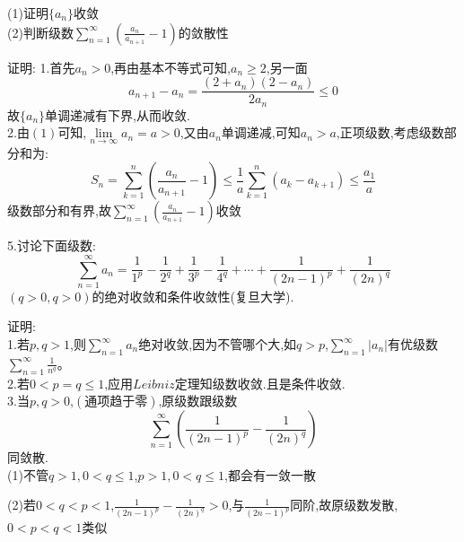 \documentclass{ctexart}
\begin{document}
\begin{tcolorbox}[title = {综合性问题},colbacktitle=red!25!white,colback=white,arc = 2mm, outer arc = 2mm,fonttitle = \itshape, fontupper = \itshape, fontlower = \itshape]
	(1)证明$\{a_{n}\}$收敛 \\
	(2)判断级数$\displaystyle{\sum\limits_{n=1}^{\infty}\left(\frac{a_{n}}{a_{n+1}} -1\right) }$的敛散性\\
	\begin{tcolorbox}[colback=white,arc = 1mm, outer arc = 1mm,fonttitle = \itshape, fontupper = \itshape, fontlower = \itshape]
		{\color{red}证明:} 1.首先$a_{n} > 0$,再由基本不等式可知,$a_{n} \ge 2$,另一面$$a_{n+1}-a_{n}=\frac{(2+a_{n})(2-a_{n})}{2a_{n}} \le 0$$故$\{a_{n}\}$单调递减有下界,从而收敛.\\
		2.由$(1)$可知,$\lim\limits_{n \to \infty}a_{n}=a > 0$,又由${a_{n}}$单调递减,可知$a_{n} > a $,正项级数,考虑级数部分和为:
		$$S_{n}=\sum_{k=1}^{n}\left(\frac{a_{n}}{a_{n+1}} -1\right) \le \frac{1}{a}\sum_{k=1}^{n}\left(a_{k}-a_{k+1} \right) \le\frac{a_{1}}{a} $$
		级数部分和有界,故$\displaystyle{\sum\limits_{n=1}^{\infty}\left(\frac{a_{n}}{a_{n+1}} -1\right) }$收敛
		
	\end{tcolorbox}
	5.讨论下面级数:
	$$\sum_{n=1}^{\infty}a_{n}=\frac{1}{1^{p}}-\frac{1}{2^{q}}+\frac{1}{3^{p}}-\frac{1}{4^{q}}+ \cdots + \frac{1}{(2n-1)^{p}}+\frac{1}{(2n)^{q}}$$
	$\left( q > 0,q > 0\right) $的绝对收敛和条件收敛性(复旦大学).
      \begin{tcolorbox}[colback=white,arc = 1mm, outer arc = 1mm,fonttitle = \itshape, fontupper = \itshape, fontlower = \itshape]
  	{\color{red}证明:}\\
  	1.若$p,q>1$,则$\displaystyle{\sum_{n=1}^{\infty}a_{n}}$绝对收敛,因为不管哪个大,如$q>p$,$\displaystyle{\sum_{n=1}^{\infty}\left |a_{n}\right |} $有优级数$\displaystyle{\sum_{n=1}^{\infty}\frac{1}{n^{q}}}$。\\
  	2.若$0<p=q \le 1$,应用$Leibniz$定理知级数收敛.且是条件收敛.\\
  	3.当$p,q>0$,$\left(\text{通项趋于零} \right)$,原级数跟级数$$\sum_{n=1}^{\infty}\left( \frac{1}{\left(2n-1\right)^{p} }-\frac{1}{\left(2n\right)^{q} }\right) $$同敛散.\\
  	(1)不管$q>1,0< q \le 1$,$p>1,0< q \le 1$,都会有一敛一散
  	
  	(2)若$0<q<p<1$,$\displaystyle{\frac{1}{(2n-1)^{p}}-\frac{1}{(2n)^{q}} > 0}$,与$\displaystyle{\frac{1}{(2n-1)^{p}}}$同阶,故原级数发散,$0<p<q<1$类似
  	
  \end{tcolorbox}
	

\end{tcolorbox}
\end{document}
